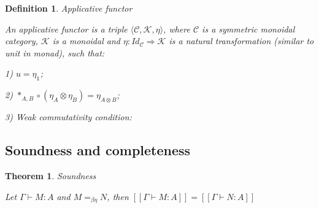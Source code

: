 \documentclass[a4paper]{article}
\newtheorem{theorem}{Theorem}
\newtheorem{defin}{Definition}
\begin{document}
\begin{defin} Applicative functor

  An applicative functor is a triple $\langle \mathcal{C}, \mathcal{K}, \eta \rangle$,
where $\mathcal{C}$ is a symmetric monoidal category, $\mathcal{K}$ is a monoidal and $\eta : Id_{\mathcal{C}} \Rightarrow \mathcal{K}$ is a natural transformation (similar to unit in monad), such that:

1) $u = \eta_{\mathds{1}}$;

2) $\ast_{A,B} \circ (\eta_A \otimes \eta_B) = \eta_{A \otimes B}$;

3) Weak commutativity condition:

\end{defin}

\subsection{Soundness and completeness}

\begin{theorem} Soundness

  Let $\Gamma \vdash M : A$ and $M =_{\beta\eta} N$, then $[\![\Gamma \vdash M : A]\!] = [\![\Gamma \vdash N : A]\!]$
\end{theorem}
\end{document}
